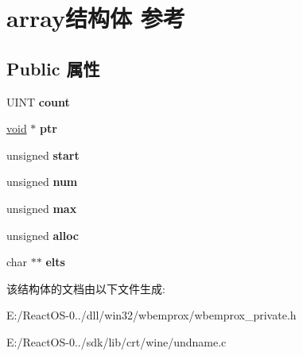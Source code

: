 \hypertarget{structarray}{}\section{array结构体 参考}
\label{structarray}
\subsection*{Public 属性}
\begin{DoxyCompactItemize}
\item 
\mbox{\label{structarray_af9ca133744e7f295f6b0e10e06d0287d}} 
U\+I\+NT {\bfseries count}
\item 
\mbox{\label{structarray_a966b78d288192f313c06b69231aba045}} 
\hyperlink{interfacevoid}{void} $\ast$ {\bfseries ptr}
\item 
\mbox{\label{structarray_ac6e7b67d1671364b4e281522a1a1126f}} 
unsigned {\bfseries start}
\item 
\mbox{\label{structarray_a2b7d6102b66b80d4a1ba8284a86ebd66}} 
unsigned {\bfseries num}
\item 
\mbox{\label{structarray_acffea417df06e34d9800b042df300d95}} 
unsigned {\bfseries max}
\item 
\mbox{\label{structarray_a88f9430d5f1c7625143e08503122c72d}} 
unsigned {\bfseries alloc}
\item 
\mbox{\label{structarray_ab48688fc00c386b36ebdf74c971c391f}} 
char $\ast$$\ast$ {\bfseries elts}
\end{DoxyCompactItemize}


该结构体的文档由以下文件生成\+:\begin{DoxyCompactItemize}
\item 
E\+:/\+React\+O\+S-\/0../dll/win32/wbemprox/wbemprox\+\_\+private.\+h\item 
E\+:/\+React\+O\+S-\/0../sdk/lib/crt/wine/undname.\+c\end{DoxyCompactItemize}
